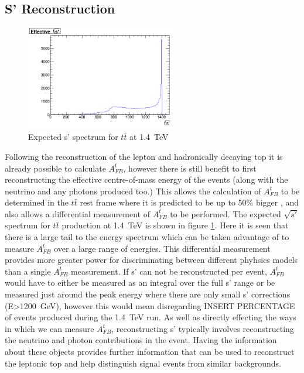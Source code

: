 \subsection{S' Reconstruction}

\begin{figure}
  \centering
  \includegraphics[width=0.6\textwidth]{TopAnalysis/figures/RawSPrime.png}
  \caption[Expected s' spectrum for $t\bar{t}$ at 1.4~TeV]{Expected s' spectrum for $t\bar{t}$ at 1.4~TeV}
  \label{fig:trueSPrime}
\end{figure}

Following the reconstruction of the lepton and hadronically decaying top it is already possible to calculate $A_{FB}^{t}$, however there is still benefit to first reconstructing the effective centre-of-mass energy of the events (along with the neutrino and any photons produced too.) This allows the calculation of $A_{FB}^{t}$ to be determined in the $t\bar{t}$ rest frame where it is predicted to be up to 50\% bigger \cite{Krohn:2011tw}, and also allows a differential measurement of $A_{FB}^{t}$ to be performed. The expected $\sqrt{s'}$ spectrum for $t\bar{t}$ production at 1.4~TeV is shown in figure \ref{fig:trueSPrime}. Here it is seen that there is a large tail to the energy spectrum which can be taken advantage of to measure $A_{FB}^{t}$ over a large range of energies. This differential measurement provides more greater power for discriminating between different phyhsics models than a single $A_{FB}^{t}$ measurement. If s' can not be reconstructed per event, $A_{FB}^{t}$ would have to either be measured as an integral over the full s' range or be measured just around the peak energy where there are only small s' corrections (E>1200~GeV), however this would mean disregarding INSERT PERCENTAGE of events produced during the 1.4~TeV run. As well as directly effecting the ways in which we can measure $A_{FB}^{t}$, reconstructing s' typically involves reconstructing the neutrino and photon contributions in the event. Having the information about these objects provides further information that can be used to reconstruct the leptonic top and help distinguish signal events from similar backgrounds.

